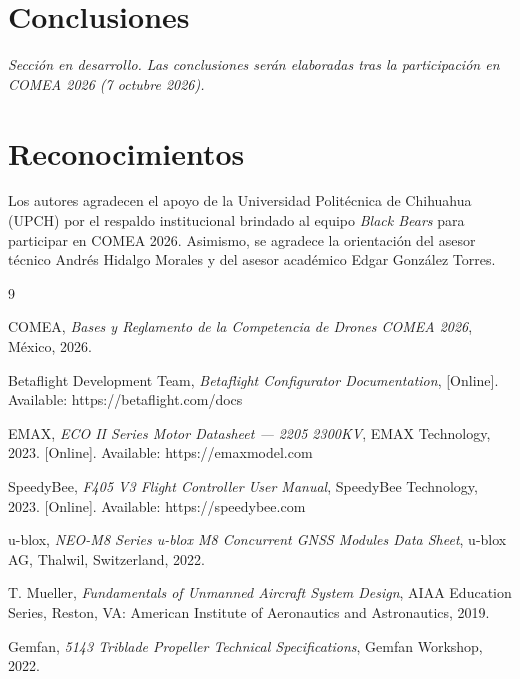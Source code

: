 \documentclass[10pt, twocolumn, letterpaper]{article}
\begin{document}
\section{Conclusiones}
\noindent\textit{Sección en desarrollo. Las conclusiones serán elaboradas tras la participación en COMEA 2026 (7 octubre 2026).}

\noindent{}

\section*{Reconocimientos}
Los autores agradecen el apoyo de la Universidad Politécnica de Chihuahua (UPCH) por el respaldo institucional brindado al equipo \textit{Black Bears} para participar en COMEA 2026. Asimismo, se agradece la orientación del asesor técnico Andrés Hidalgo Morales y del asesor académico Edgar González Torres.

\begin{thebibliography}{9}
\fontsize{8}{9}\selectfont

COMEA, \textit{Bases y Reglamento de la Competencia de Drones COMEA 2026}, México, 2026.

Betaflight Development Team, \textit{Betaflight Configurator Documentation}, [Online]. Available: https://betaflight.com/docs

EMAX, \textit{ECO II Series Motor Datasheet — 2205 2300KV}, EMAX Technology, 2023. [Online]. Available: https://emaxmodel.com

SpeedyBee, \textit{F405 V3 Flight Controller User Manual}, SpeedyBee Technology, 2023. [Online]. Available: https://speedybee.com

u-blox, \textit{NEO-M8 Series u-blox M8 Concurrent GNSS Modules Data Sheet}, u-blox AG, Thalwil, Switzerland, 2022.

T. Mueller, \textit{Fundamentals of Unmanned Aircraft System Design}, AIAA Education Series, Reston, VA: American Institute of Aeronautics and Astronautics, 2019.

Gemfan, \textit{5143 Triblade Propeller Technical Specifications}, Gemfan Workshop, 2022.

\end{thebibliography}
\end{document}
